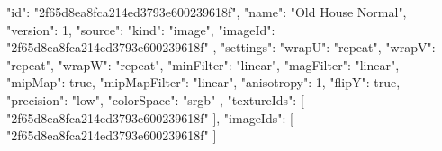 {
  "id": "2f65d8ea8fca214ed3793e600239618f",
  "name": "Old House Normal",
  "version": 1,
  "source": {
    "kind": "image",
    "imageId": "2f65d8ea8fca214ed3793e600239618f"
  },
  "settings": {
    "wrapU": "repeat",
    "wrapV": "repeat",
    "wrapW": "repeat",
    "minFilter": "linear",
    "magFilter": "linear",
    "mipMap": true,
    "mipMapFilter": "linear",
    "anisotropy": 1,
    "flipY": true,
    "precision": "low",
    "colorSpace": "srgb"
  },
  "textureIds": [
    "2f65d8ea8fca214ed3793e600239618f"
  ],
  "imageIds": [
    "2f65d8ea8fca214ed3793e600239618f"
  ]
}
